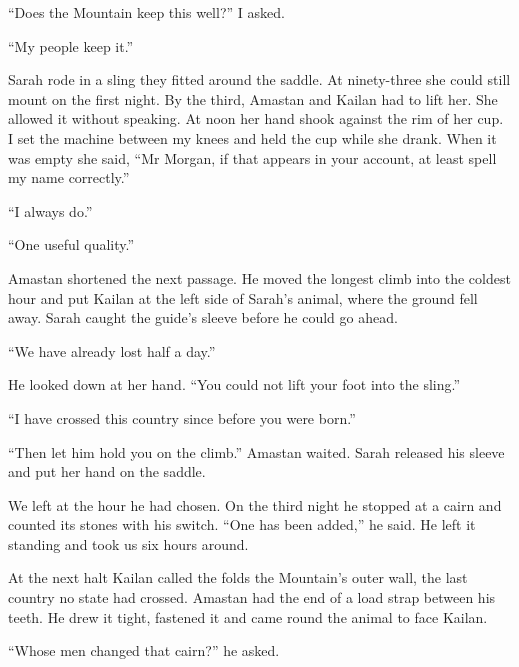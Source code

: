 ``Does the Mountain keep this well?'' I asked.\par

``My people keep it.''\par

Sarah rode in a sling they fitted around the saddle. At ninety-three she could still mount on the first night. By the third, Amastan and Kailan had to lift her. She allowed it without speaking. At noon her hand shook against the rim of her cup. I set the machine between my knees and held the cup while she drank. When it was empty she said, ``Mr Morgan, if that appears in your account, at least spell my name correctly.''\par

``I always do.''\par

``One useful quality.''\par

Amastan shortened the next passage. He moved the longest climb into the coldest hour and put Kailan at the left side of Sarah's animal, where the ground fell away. Sarah caught the guide's sleeve before he could go ahead.\par

``We have already lost half a day.''\par

He looked down at her hand. ``You could not lift your foot into the sling.''\par

``I have crossed this country since before you were born.''\par

``Then let him hold you on the climb.'' Amastan waited. Sarah released his sleeve and put her hand on the saddle.\par

We left at the hour he had chosen. On the third night he stopped at a cairn and counted its stones with his switch. ``One has been added,'' he said. He left it standing and took us six hours around.\par

At the next halt Kailan called the folds the Mountain's outer wall, the last country no state had crossed. Amastan had the end of a load strap between his teeth. He drew it tight, fastened it and came round the animal to face Kailan.\par

``Whose men changed that cairn?'' he asked.\par

